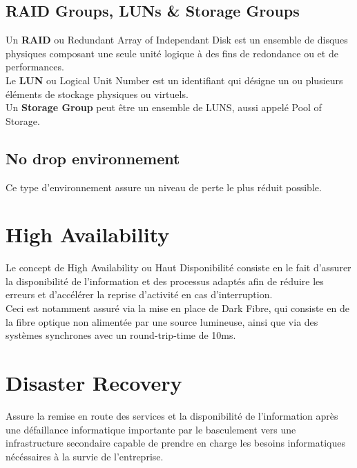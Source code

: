 \documentclass{report}
\begin{document}
		\subsection{RAID Groups, LUNs \& Storage Groups}

			Un \textbf{RAID} ou Redundant Array of Independant Disk est un ensemble de disques physiques composant une seule unité logique à des fins de redondance ou et de performances.\\

			Le \textbf{LUN} ou Logical Unit Number est un identifiant qui désigne un ou plusieurs éléments de stockage physiques ou virtuels.\\

			Un \textbf{Storage Group} peut être un ensemble de LUNS, aussi appelé Pool of Storage.\\

		\subsection{No drop environnement}

			Ce type d'environnement assure un niveau de perte le plus réduit possible.\\

	\section{High Availability}

		Le concept de High Availability ou Haut Disponibilité consiste en le fait d'assurer la disponibilité de l'information et des processus adaptés afin de réduire les erreurs et d'accélérer la reprise d'activité en cas d'interruption.\\

		Ceci est notamment assuré via la mise en place de Dark Fibre, qui consiste en de la fibre optique non alimentée par une source lumineuse, ainsi que via des systèmes synchrones avec un round-trip-time de 10ms.\\

	\section{Disaster Recovery}

		Assure la remise en route des services et la disponibilité de l'information après une défaillance informatique importante par le basculement vers une infrastructure secondaire capable de prendre en charge les besoins informatiques nécéssaires à la survie de l'entreprise.\\
\end{document}
